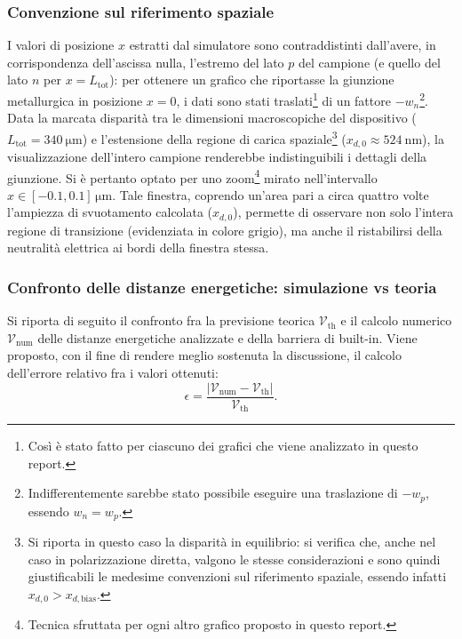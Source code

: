 \documentclass[a4paper,11pt]{report}
\begin{document}
\subsubsection{Convenzione sul riferimento spaziale}
I valori di posizione $x$ estratti dal simulatore sono contraddistinti dall'avere, in corrispondenza dell'ascissa nulla, l'estremo del lato $p$ del campione (e quello del lato $n$ per $x = L_{\text{tot}}$): per ottenere un grafico che riportasse la giunzione metallurgica in posizione $x = 0$, i dati sono stati traslati\footnote{Così è stato fatto per ciascuno dei grafici che viene analizzato in questo report.} di un fattore $-w_n$\footnote{Indifferentemente sarebbe stato possibile eseguire una traslazione di $-w_p$, essendo $w_n = w_p$.}. Data la marcata disparità tra le dimensioni macroscopiche del dispositivo ($L_{\text{tot}} = \SI{340}{\micro\meter}$) e l'estensione della regione di carica spaziale\footnote{Si riporta in questo caso la disparità in equilibrio: si verifica che, anche nel caso in polarizzazione diretta, valgono le stesse considerazioni e sono quindi giustificabili le medesime convenzioni sul riferimento spaziale, essendo infatti $x_{d,0} > x_{d,\text{bias}}$.} ($x_{d,0} \approx \SI{524}{\nano\meter}$), la visualizzazione dell'intero campione renderebbe indistinguibili i dettagli della giunzione. Si è pertanto optato per uno zoom\footnote{Tecnica sfruttata per ogni altro grafico proposto in questo report.} mirato nell'intervallo $x \in [-0.1, 0.1]\,\si{\micro\meter}$. Tale finestra, coprendo un'area pari a circa quattro volte l'ampiezza di svuotamento calcolata ($x_{d,0}$), permette di osservare non solo l'intera regione di transizione (evidenziata in colore grigio), ma anche il ristabilirsi della neutralità elettrica ai bordi della finestra stessa.



\subsubsection{Confronto delle distanze energetiche: simulazione vs teoria}
Si riporta di seguito il confronto fra la previsione teorica $\mathcal{V}_{\text{th}}$ e il calcolo numerico $\mathcal{V}_{\text{num}}$ delle distanze energetiche analizzate e della barriera di built-in. Viene proposto, con il fine di rendere meglio sostenuta la discussione, il calcolo dell'errore relativo fra i valori ottenuti:
\begin{equation}
\epsilon = \frac{|\mathcal{V}_{\text{num}} - \mathcal{V}_{\text{th}}|}{\mathcal{V}_{\text{th}}}.
\end{equation}
\end{document}
